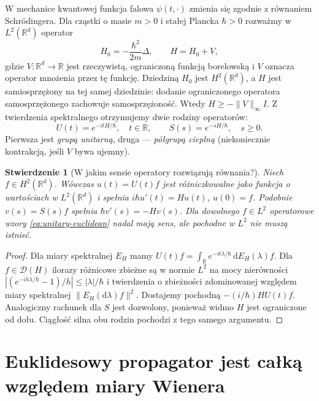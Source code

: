 \documentclass[11pt,a4paper,oneside]{report}
\numberwithin{equation}{chapter}
\theoremstyle{plain}
\newtheorem{stwierdzenie}[twierdzenie]{Stwierdzenie}
\theoremstyle{definition}
\theoremstyle{remark}
\newcommand{\R}{\mathbb{R}}
\newcommand{\dd}{\mathrm{d}}
\begin{document}
W mechanice kwantowej funkcja falowa $\psi(t,\cdot)$ zmienia się
zgodnie z równaniem Schrödingera. Dla cząstki o masie $m>0$
i stałej Plancka $\hbar>0$ rozważmy w $L^2(\R^d)$
operator
\[
 H_0=-\frac{\hbar^2}{2m}\Delta,
 \qquad H=H_0+V,
\tag{16.1}\label{eq:QM-H}
\]
gdzie $V:\R^d\to\R$ jest rzeczywistą, ograniczoną funkcją
borelowską i $V$ oznacza operator mnożenia przez tę funkcję.
Dziedziną $H_0$ jest $H^2(\R^d)$, a $H$ jest
samiosprzężony na tej samej dziedzinie: dodanie ograniczonego
operatora samosprzężonego zachowuje samosprzężoność.
Wtedy $H\ge-\|V\|_\infty I$. Z twierdzenia spektralnego
otrzymujemy dwie rodziny operatorów:
\[
 U(t)=e^{-itH/\hbar},\quad t\in\R,\qquad
 S(s)=e^{-sH/\hbar},\quad s\ge0.
\tag{16.2}\label{eq:unitary-euclidean}
\]
Pierwsza jest \emph{grupą unitarną}, druga --- \emph{półgrupą
cieplną} (niekoniecznie kontrakcją, jeśli $V$ bywa ujemny).

\begin{stwierdzenie}[W jakim sensie operatory rozwiązują równania?]
\label{prop:unitary-generator}
Niech $f\in H^2(\R^d)$. Wówczas $u(t)=U(t)f$ jest
różniczkowalne jako funkcja o wartościach w $L^2(\R^d)$
i spełnia $i\hbar u'(t)=Hu(t)$, $u(0)=f$.
Podobnie $v(s)=S(s)f$ spełnia $\hbar v'(s)=-Hv(s)$.
Dla dowolnego $f\in L^2$ operatorowe wzory
\eqref{eq:unitary-euclidean} nadal mają sens, ale
pochodne w $L^2$ nie muszą istnieć.
\end{stwierdzenie}
\begin{proof}
Dla miary spektralnej $E_H$ mamy
$U(t)f=\int_{\R}e^{-it\lambda/\hbar}\,\dd E_H(\lambda)f$.
Dla $f\in\mathcal D(H)$ ilorazy różnicowe zbieżne są
w normie $L^2$ na mocy nierówności
$|(e^{-ih\lambda/\hbar}-1)/h|\le|\lambda|/\hbar$
i twierdzenia o zbieżności zdominowanej względem
miary spektralnej $\|E_H(\dd\lambda)f\|^2$.
Dostajemy pochodną $-(i/\hbar)HU(t)f$.
Analogiczny rachunek dla $S$ jest dozwolony, ponieważ
widmo $H$ jest ograniczone od dołu. Ciągłość silna
obu rodzin pochodzi z tego samego argumentu.
\end{proof}

\section{Euklidesowy propagator jest całką względem miary Wienera}
\end{document}
